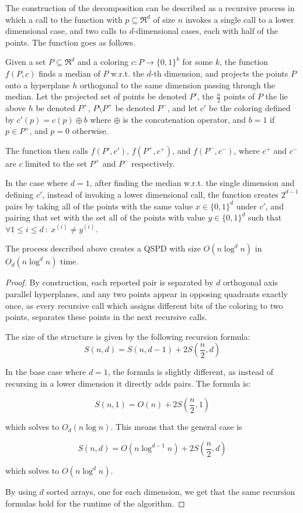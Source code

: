 \documentclass[12pt]{article}%
\begin{document}
The construction of the decomposition can be described as a recursive process in which a call to the function with $p\subseteq \Re^d$ of size $n$ invokes a single call to a lower dimensional case, and two calls to $d$-dimensional cases, each with half of the points. The function goes as follows.

Given a set $P\subseteq \Re^d$ and a coloring $c:P\longrightarrow \{0,1\}^k$ for some $k$, the function $f(P,c)$ finds a median of $P$ w.r.t. the $d$-th dimension, and projects the points $P$ onto a hyperplane $h$ orthogonal to the same dimension passing through the median. Let the projected set of points be denoted $P'$, the $\frac{n}{2}$ points of $P$ the lie above $h$ be denoted $P^+$, $P\setminus P^+$ be denoted $P^-$, and let $c'$ be the coloring defined by  $c'(p)=c(p)\oplus b$ where $\oplus$ is the concatenation operator, and $b=1$ if $p\in P^+$, and $p=0$ otherwise.

The function then calls $f(P', c')$, $f(P^+, c^+)$, and $f(P^-, c^-)$, where $c^+$ and $c^-$ are $c$ limited to the set $P^+$ and $P^-$ respectively.

In the case where $d=1$, after finding the median w.r.t. the single dimension and defining $c'$, instead of invoking a lower dimensional call, the function creates $2^{d-1}$ pairs by taking all of the points with the same value $x\in\{0,1\}^d$ under $c'$, and pairing that set with the set all of the points with value $y\in\{0,1\}^d$ such that $\forall 1\leq i\leq d~:~ x^{(i)}\neq y^{(i)}$.


\begin{claim}
	The process described above creates a QSPD with size $O(n\log^dn)$ in $O_d(n\log^dn)$ time.
\end{claim}

\begin{proof}
	By construction, each reported pair is separated by $d$ orthogonal axis parallel hyperplanes, and any two points appear in opposing quadrants exactly once, as every recursive call which assigns different bits of the coloring to two points, separates these points in the next recursive calls. 
	
	The size of the structure is given by the following recursion formula:
	$$S(n,d) = S(n,d-1) + 2S\left(\frac{n}{2},d\right)$$
	
	In the base case where $d=1$, the formula is slightly different, as instead of recursing in a lower dimension it directly adds pairs. The formula is:
	
	$$S(n,1) = O(n) + 2S\left(\frac{n}{2},1\right)$$
	
	which solves to $O_d(n\log n)$. This means that the general case is 
	
	$$S(n,d) = O(n\log^{d-1}n) + 2S\left(\frac{n}{2},d\right)$$
	
	which solves to $O(n\log^d n)$.
	
	By using $d$ sorted arrays, one for each dimension, we get that the same recursion formulas hold for the runtime of the algorithm.
\end{proof}
\end{document}
